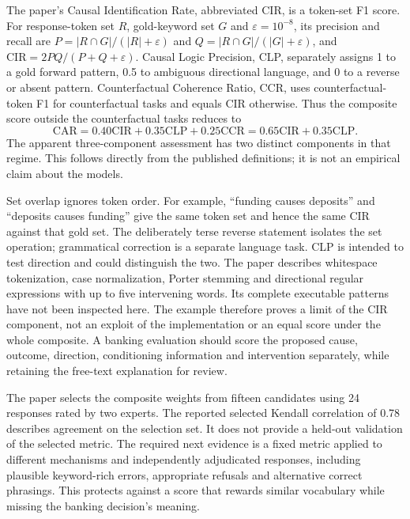 The paper's Causal Identification Rate, abbreviated CIR, is a token-set F1
score. For response-token set $R$, gold-keyword set $G$ and
$\varepsilon=10^{-8}$, its precision and recall are
$P=|R\cap G|/(|R|+\varepsilon)$ and
$Q=|R\cap G|/(|G|+\varepsilon)$, and
$\mathrm{CIR}=2PQ/(P+Q+\varepsilon)$. Causal Logic Precision, CLP, separately
assigns 1 to a gold forward pattern, 0.5 to ambiguous directional language,
and 0 to a reverse or absent pattern. Counterfactual Coherence Ratio, CCR,
uses counterfactual-token F1 for counterfactual tasks and equals CIR otherwise.
Thus the composite score outside the counterfactual tasks reduces to
\begin{equation}
 \mathrm{CAR}
 =0.40\mathrm{CIR}+0.35\mathrm{CLP}+0.25\mathrm{CCR}
 =0.65\mathrm{CIR}+0.35\mathrm{CLP}.
 \label{exec17:benchmark-score}
\end{equation}
The apparent three-component assessment has two distinct components in that
regime. This follows directly from the published definitions; it is not an
empirical claim about the models.
\citep{exec17_benchmark_cherif,exec17_benchmark_exact}

Set overlap ignores token order. For example, ``funding causes deposits'' and
``deposits causes funding'' give the same token set and hence the same CIR
against that gold set. The deliberately terse reverse statement isolates the
set operation; grammatical correction is a separate language task. CLP is
intended to test direction and could distinguish the two. The paper describes
whitespace tokenization, case normalization, Porter stemming and directional
regular expressions with up to five intervening words. Its complete executable
patterns have not been inspected here. The example therefore proves a limit
of the CIR component, not an exploit of the implementation or an equal score
under the whole composite. A banking evaluation should score the proposed
cause, outcome, direction, conditioning information and intervention
separately, while retaining the free-text explanation for review.
\citep{exec17_benchmark_cherif,exec17_benchmark_exact}

The paper selects the composite weights from fifteen candidates using 24
responses rated by two experts. The reported selected Kendall correlation
of 0.78 describes agreement on the selection set. It does not provide a
held-out validation of the selected metric. The required next evidence is a
fixed metric applied to different mechanisms and independently adjudicated
responses, including plausible keyword-rich errors, appropriate refusals and
alternative correct phrasings. This protects against a score that rewards
similar vocabulary while missing the banking decision's meaning.
\citep{exec17_benchmark_cherif}

